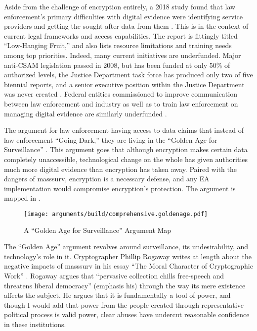 Aside from the challenge of encryption entirely, a 2018 study found that law enforcement's primary difficulties with
digital evidence were identifying service providers and getting the sought after data from them \cite{carter_2018}. This
is in the context of current legal frameworks and access capabilities. The report is fittingly titled ``Low-Hanging
Fruit,'' and also lists resource limitations and training needs among top priorities. Indeed, many current initiatives
are underfunded. Major anti-\ac{CSAM} legislation passed in 2008, but has been funded at only 50\% of authorized levels,
the Justice Department task force has produced only two of five biennial reports, and a senior executive position within
the Justice Department was never created \cite{keller_internet_2019}. Federal entities commissioned to improve
communication between law enforcement and industry as well as to train law enforcement on managing digital evidence are
similarly underfunded \cite{carter_2018}.


The argument for law enforcement having  access to data claims that instead of law enforcement ``Going
Dark,'' they are living in the ``Golden Age for Surveillance'' \cite{swire_encryption_2011}. This argument goes that
although encryption makes certain data completely unaccessible, technological change on the whole has given authorities
much more digital evidence than encryption has taken away. Paired with the dangers of \ac{masssurv}, encryption is a
necessary defense, and any \ac{EA} implementation would compromise encryption's protection. The argument is mapped in
.

\begin{figure}[p!]
  \centering\CaptionFontSize
  \texttt{[image: arguments/build/comprehensive.goldenage.pdf]}
  \caption{A ``Golden Age for Surveillance'' Argument Map}
  \label{fig-arg-golden-age}
\end{figure}

The ``Golden Age'' argument revolves around surveillance, its undesirability, and technology's role in it. Cryptographer
Phillip Rogaway writes at length about the negative impacts of \ac{masssurv} in his essay ``The Moral Character of
Cryptographic Work'' \cite{rogaway_moral_2015}. Rogaway argues that ``pervasive collection  chills
free-speech and threatens liberal democracy'' (emphasis his) through the way its mere existence affects the subject. He
argues that it is fundamentally a tool of power, and though I would add that power from the people created through
representative political process is valid power, clear abuses have undercut reasonable confidence in these institutions.

